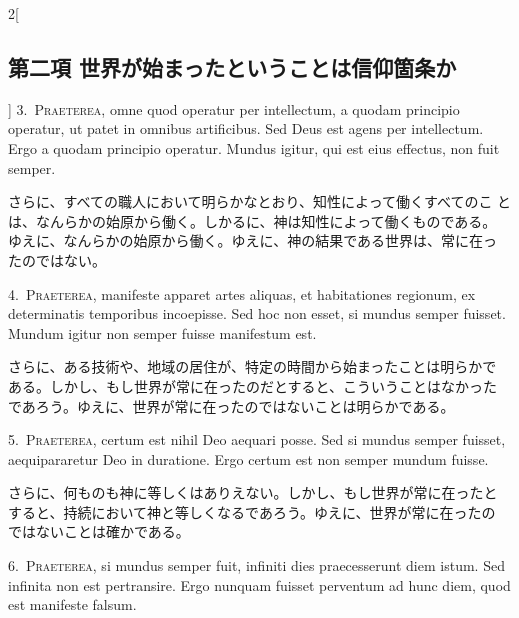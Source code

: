 \documentclass[paper=a4paper,fontsize=10pt,jafontsize=9pt,titlepage]{jlreq}
\begin{document}
\begin{paracol}{2}[\subsection{第二項 世界が始まったということは信仰箇条か}]
3.~{\scshape Praeterea}, omne quod operatur per intellectum, a quodam
 principio operatur, ut patet in omnibus artificibus. Sed Deus est agens
 per intellectum. Ergo a quodam principio operatur. Mundus igitur, qui
 est eius effectus, non fuit semper.


\switchcolumn


さらに、すべての職人において明らかなとおり、知性によって働くすべてのこ
とは、なんらかの始原から働く。しかるに、神は知性によって働くものである。
ゆえに、なんらかの始原から働く。ゆえに、神の結果である世界は、常に在っ
たのではない。




4.~{\scshape Praeterea}, manifeste apparet artes aliquas, et habitationes
 regionum, ex determinatis temporibus incoepisse. Sed hoc non esset, si
 mundus semper fuisset. Mundum igitur non semper fuisse manifestum est.


\switchcolumn


さらに、ある技術や、地域の居住が、特定の時間から始まったことは明らかで
ある。しかし、もし世界が常に在ったのだとすると、こういうことはなかった
であろう。ゆえに、世界が常に在ったのではないことは明らかである。




5.~{\scshape Praeterea}, certum est nihil Deo aequari posse. Sed si mundus
 semper fuisset, aequipararetur Deo in duratione. Ergo certum est non
 semper mundum fuisse.


\switchcolumn


さらに、何ものも神に等しくはありえない。しかし、もし世界が常に在ったと
すると、持続において神と等しくなるであろう。ゆえに、世界が常に在ったの
ではないことは確かである。




6.~{\scshape Praeterea}, si mundus semper fuit, infiniti dies praecesserunt
 diem istum. Sed infinita non est pertransire. Ergo nunquam fuisset
 perventum ad hunc diem, quod est manifeste falsum.



\end{paracol}
\end{document}
